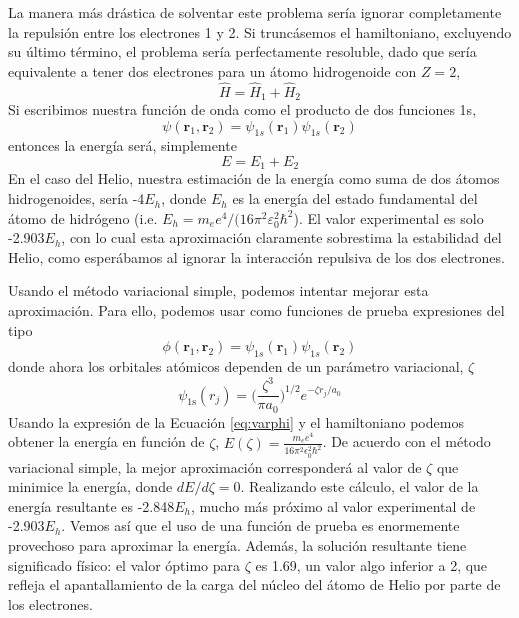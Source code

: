 \documentclass{tufte-handout}
\begin{document}
La manera más drástica de solventar este problema 
sería ignorar completamente la repulsión entre los electrones
1 y 2. Si truncásemos el hamiltoniano, excluyendo su último
término, el problema sería perfectamente resoluble, dado
que sería equivalente a tener dos electrones para un átomo
hidrogenoide con $Z=2$,
\begin{equation}
\hat{H} = \hat{H}_1+ \hat{H}_2
\end{equation}
Si escribimos nuestra función de onda como
el producto de dos funciones 1s,
\begin{equation}
    \psi(\mathbf{r}_1, \mathbf{r}_2)=\psi_{1s}(\mathbf{r}_1)\psi_{1s}(\mathbf{r}_2)
\end{equation}
entonces la energía será, simplemente
\begin{equation}
    E = E_1 + E_2 
\end{equation}
En el caso del Helio, nuestra estimación de la energía
como suma de dos átomos hidrogenoides, sería -4$E_h$, 
donde $E_h$ es la energía del estado fundamental
del átomo de hidrógeno (i.e.
$E_h=m_ee^4/(16\pi^2\varepsilon_0^2\hbar^2$). El valor 
experimental es solo -2.903$E_h$, con lo cual esta aproximación
claramente sobrestima la estabilidad del Helio, como
esperábamos al ignorar la interacción repulsiva
de los dos electrones.

Usando el método variacional simple, podemos intentar mejorar 
esta aproximación. Para ello, podemos usar como funciones
de prueba expresiones del tipo
\begin{equation}
    \phi(\mathbf{r}_1, \mathbf{r}_2)=\psi_{1s}(\mathbf{r}_1)\psi_{1s}(\mathbf{r}_2)
    \label{eq:varphi}
\end{equation}
donde ahora los orbitales atómicos dependen de un 
parámetro variacional, $\zeta$
\begin{equation}
    \psi_\mathrm{1s}(r_j)=\bigg(\frac{\zeta^3}{\pi a_0}\bigg)^{1/2}e^{-\zeta r_j/a_0}
\end{equation}
Usando la expresión de la Ecuación \ref{eq:varphi} y el 
hamiltoniano podemos obtener la energía en función de $\zeta$,
$E(\zeta)=\frac{m_ee^4}{16\pi^2\epsilon_0^2\hbar^2}$.
De acuerdo con el método variacional simple, la mejor aproximación
corresponderá al valor de $\zeta$ que minimice la energía, donde
$dE/d\zeta=0$. Realizando este cálculo, el valor de la energía
resultante es -2.848$E_h$, mucho más próximo al valor 
experimental de -2.903$E_h$. Vemos así que el uso de una
función de prueba es enormemente provechoso para aproximar
la energía. Además, la solución resultante tiene significado
físico: el valor óptimo para $\zeta$ es 1.69, un valor algo
inferior a 2, que refleja el apantallamiento de la carga del
núcleo del átomo de Helio por parte de los electrones. 
\end{document}
